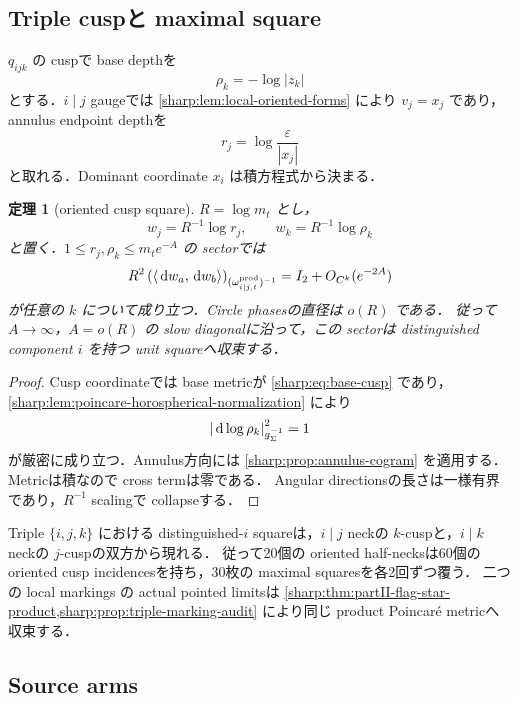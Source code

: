 \documentclass[a4paper,11pt]{ltjsarticle}
\numberwithin{equation}{section}
\theoremstyle{plain}
\newtheorem{theorem}{定理}[section]
\theoremstyle{definition}
\theoremstyle{remark}
\newcommand{\eps}{\varepsilon}\newcommand{\dd}{\,\mathrm d}\newcommand{\ddc}{\sqrt{-1}\,\partial\bar\partial}
\begin{document}
\subsection{Triple cuspと maximal square}

$q_{ijk}$ の cuspで base depthを
\[
 \rho_k=-\log|z_k|
\]
とする．$i\mid j$ gaugeでは \cref{sharp:lem:local-oriented-forms} により $v_j=x_j$ であり，annulus endpoint depthを
\[
 r_j=\log\frac{\eps}{|x_j|}
\]
と取れる．Dominant coordinate $x_i$ は積方程式から決まる．

\begin{theorem}[oriented cusp square]\label{sharp:thm:oriented-square}
$R=\log m_t$ とし，
\begin{equation}\label{sharp:eq:square-map}
 w_j=R^{-1}\log r_j,
 \qquad w_k=R^{-1}\log\rho_k
\end{equation}
と置く．$1\le r_j,\rho_k\le m_te^{-A}$ の sectorでは
\begin{equation}\label{sharp:eq:square-cogram}
 R^2\left(\inner{\dd w_a}{\dd w_b}\right)_{(\omega_{i\mid j,t}^{\mathrm{prod}})^{-1}}
 =I_2+O_{C^k}(e^{-2A})
\end{equation}
が任意の $k$ について成り立つ．Circle phasesの直径は $o(R)$ である．
従って $A\to\infty$，$A=o(R)$ の slow diagonalに沿って，この sectorは distinguished component $i$ を持つ unit squareへ収束する．
\end{theorem}

\begin{proof}
Cusp coordinateでは base metricが \eqref{sharp:eq:base-cusp} であり，\cref{sharp:lem:poincare-horospherical-normalization} により
\[
 \Abs{\dd\log\rho_k}_{g_{\Sigma}^{-1}}^2=1
\]
が厳密に成り立つ．Annulus方向には \cref{sharp:prop:annulus-cogram} を適用する．Metricは積なので cross termは零である．
Angular directionsの長さは一様有界であり，$R^{-1}$ scalingで collapseする．
\end{proof}

\begin{remark}[squareの二重被覆]
Triple $\{i,j,k\}$ における distinguished-$i$ squareは，$i\mid j$ neckの $k$-cuspと，$i\mid k$ neckの $j$-cuspの双方から現れる．
従って20個の oriented half-necksは60個の oriented cusp incidencesを持ち，30枚の maximal squaresを各2回ずつ覆う．
二つの local markings の actual pointed limitsは \cref{sharp:thm:partII-flag-star-product,sharp:prop:triple-marking-audit} により同じ product Poincar\'e metricへ収束する．
\end{remark}

\subsection{Source arms}
\end{document}
